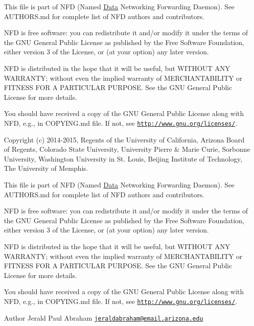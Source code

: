 This file is part of N\+FD (Named \hyperlink{classndn_1_1Data}{Data} Networking Forwarding Daemon). See A\+U\+T\+H\+O\+R\+S.\+md for complete list of N\+FD authors and contributors.

N\+FD is free software\+: you can redistribute it and/or modify it under the terms of the G\+NU General Public License as published by the Free Software Foundation, either version 3 of the License, or (at your option) any later version.

N\+FD is distributed in the hope that it will be useful, but W\+I\+T\+H\+O\+UT A\+NY W\+A\+R\+R\+A\+N\+TY; without even the implied warranty of M\+E\+R\+C\+H\+A\+N\+T\+A\+B\+I\+L\+I\+TY or F\+I\+T\+N\+E\+SS F\+OR A P\+A\+R\+T\+I\+C\+U\+L\+AR P\+U\+R\+P\+O\+SE. See the G\+NU General Public License for more details.

You should have received a copy of the G\+NU General Public License along with N\+FD, e.\+g., in C\+O\+P\+Y\+I\+N\+G.\+md file. If not, see \href{http://www.gnu.org/licenses/}{\tt http\+://www.\+gnu.\+org/licenses/}.

Copyright (c) 2014-\/2015, Regents of the University of California, Arizona Board of Regents, Colorado State University, University Pierre \& Marie Curie, Sorbonne University, Washington University in St. Louis, Beijing Institute of Technology, The University of Memphis.

This file is part of N\+FD (Named \hyperlink{classndn_1_1Data}{Data} Networking Forwarding Daemon). See A\+U\+T\+H\+O\+R\+S.\+md for complete list of N\+FD authors and contributors.

N\+FD is free software\+: you can redistribute it and/or modify it under the terms of the G\+NU General Public License as published by the Free Software Foundation, either version 3 of the License, or (at your option) any later version.

N\+FD is distributed in the hope that it will be useful, but W\+I\+T\+H\+O\+UT A\+NY W\+A\+R\+R\+A\+N\+TY; without even the implied warranty of M\+E\+R\+C\+H\+A\+N\+T\+A\+B\+I\+L\+I\+TY or F\+I\+T\+N\+E\+SS F\+OR A P\+A\+R\+T\+I\+C\+U\+L\+AR P\+U\+R\+P\+O\+SE. See the G\+NU General Public License for more details.

You should have received a copy of the G\+NU General Public License along with N\+FD, e.\+g., in C\+O\+P\+Y\+I\+N\+G.\+md file. If not, see \href{http://www.gnu.org/licenses/}{\tt http\+://www.\+gnu.\+org/licenses/}.

\begin{DoxyAuthor}{Author}
Jerald Paul Abraham \href{mailto:jeraldabraham@email.arizona.edu}{\tt jeraldabraham@email.\+arizona.\+edu} 
\end{DoxyAuthor}


